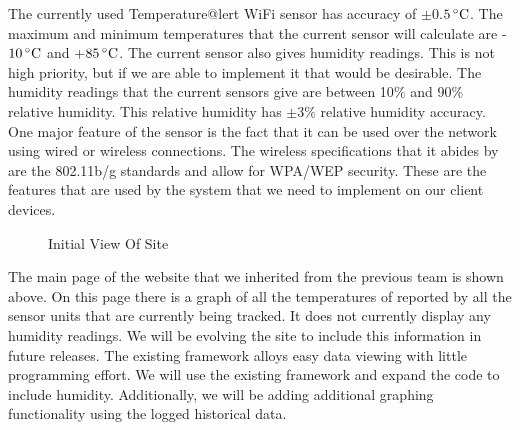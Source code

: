 \documentclass{report}
\begin{document}
\newline
\indent
The currently used Temperature@lert WiFi sensor has accuracy of $\pm$0.$5\,^{\circ}{\rm C}$. The maximum and minimum temperatures that the current sensor will calculate are -$10\,^{\circ}{\rm C}$ and +$85\,^{\circ}{\rm C}$. The current sensor also gives humidity readings. This is not high priority, but if we are able to implement it that would be desirable. The humidity readings that the current sensors give are between 10$\%$ and 90$\%$ relative humidity. This relative humidity has $\pm$3$\%$ relative humidity accuracy. One major feature of the sensor is the fact that it can be used over the network using wired or wireless connections. The wireless specifications that it abides by are the 802.11b/g standards and allow for WPA/WEP security. These are the features that are used by the system that we need to implement on our client devices.
\newpage

\begin{figure}[H]
	\caption{Initial View Of Site}
\end{figure}
\indent
The main page of the website that we inherited from the previous team is shown above. On this page there is a graph of all the temperatures of reported by all the sensor units that are currently being tracked. It does not currently display any humidity readings. We will be evolving the site to include this information in future releases. The existing framework alloys easy data viewing with little programming effort. We will use the existing framework and expand the code to include humidity. Additionally, we will be adding additional graphing functionality using the logged historical data.
\newpage
\end{document}
